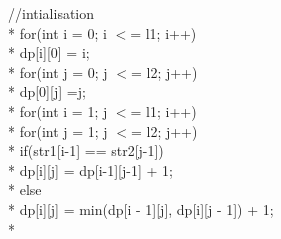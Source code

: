 \documentclass[12pt]{book}
\begin{document}
\phantom{x} \hspace{3ex}    //intialisation\\*
\phantom{x} \hspace{3ex}    for(int i = 0; i $<$= l1; i++)\\*
\phantom{x} \hspace{3ex} \phantom{x} \hspace{3ex}       dp[i][0] = i;\\*
\phantom{x} \hspace{3ex}    for(int j = 0; j $<$= l2; j++)\\*
\phantom{x} \hspace{3ex} \phantom{x} \hspace{3ex}       dp[0][j] =j;\\*
\phantom{x} \hspace{3ex}    for(int i = 1; j $<$= l1; i++)\\*
\phantom{x} \hspace{3ex} \phantom{x} \hspace{3ex}       for(int j = 1; j $<$= l2; j++)   \\* 
\phantom{x} \hspace{3ex} \phantom{x} \hspace{3ex}  \phantom{x} \hspace{3ex}         if(str1[i-1] == str2[j-1])\\*
\phantom{x} \hspace{3ex}  \phantom{x} \hspace{3ex} \phantom{x} \hspace{3ex} \phantom{x} \hspace{3ex}           dp[i][j] = dp[i-1][j-1] + 1;\\*
\phantom{x} \hspace{3ex} \phantom{x} \hspace{3ex}  \phantom{x} \hspace{3ex}         else\\*
\phantom{x} \hspace{3ex} \phantom{x} \hspace{3ex} \phantom{x} \hspace{3ex}  \phantom{x} \hspace{3ex}            dp[i][j] = min(dp[i - 1][j], dp[i][j - 1]) + 1;\\*
\end{document}
